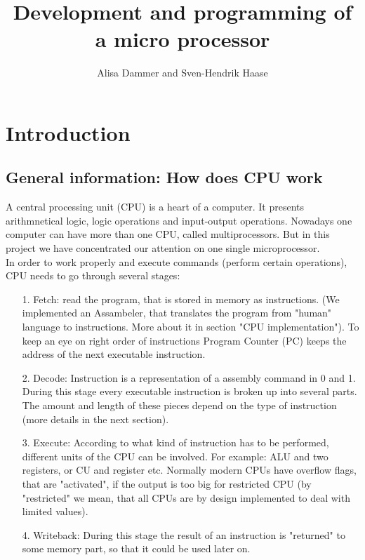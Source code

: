 \documentclass[11pt,twoside,a4paper]{article}
\begin{document}
\title{Development and programming of a micro processor}
\author{Alisa Dammer and Sven-Hendrik Haase}
\maketitle

\section{Introduction}
\subsection{General information: How does CPU work}
A central processing unit (CPU) is a heart of a computer. It presents arithmnetical logic, logic operations and input-output operations. Nowadays one computer can have more than one CPU, called multiprocessors. But in this project we have concentrated our attention on one single microprocessor.\\
In order to work properly and execute commands (perform certain operations), CPU needs to go through several stages:
\begin{enumerate}
	\item[1.] Fetch: read the program, that is stored in memory as instructions. (We implemented an Assambeler, that translates the program from "human" language to instructions. More about it in  section "CPU implementation"). To keep an eye on right order of instructions Program Counter (PC) keeps the address of the next executable instruction.
	\item[2.] Decode: Instruction is a representation of a assembly command in 0 and 1. During this stage every executable instruction is broken up into several parts. The amount and length of these pieces depend on the type of instruction (more details in the next section). 
	\item[3.] Execute: According to what kind of instruction has to be performed, different units of the CPU can be involved. For example: ALU and two registers, or CU and register etc. Normally modern CPUs have overflow flags, that are "activated", if the output is too big for restricted CPU (by "restricted" we mean, that all CPUs are by design implemented to deal with limited values).
	\item[4.] Writeback: During this stage the result of an instruction is "returned" to some memory part, so that it could be used later on.
\end{enumerate}
\end{document}
